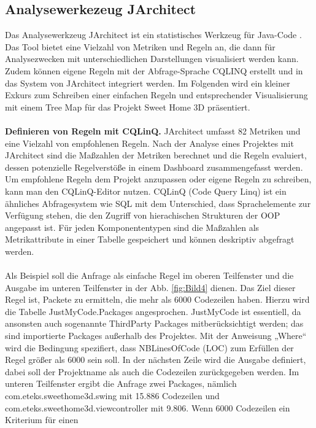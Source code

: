 \documentclass[12pt]{article}
\begin{document}
\subsection{Analysewerkezeug JArchitect}

Das Analysewerkzeug JArchitect ist ein statistisches Werkzeug für
Java-Code \cite{Get18}. Das Tool bietet eine Vielzahl von Metriken
und Regeln an, die dann für Analysezwecken mit unterschiedlichen
Darstellungen visualisiert werden kann. Zudem können eigene
Regeln mit der Abfrage-Sprache CQLINQ erstellt und in das System
von JArchitect integriert werden. Im Folgenden wird ein kleiner
Exkurs zum Schreiben einer einfachen Regeln und entsprechender
Visualisierung mit einem Tree Map für das Projekt Sweet Home 3D
präsentiert.
\\
\\
\textbf{Definieren von Regeln mit CQLinQ.} JArchitect umfasst 82
Metriken und eine Vielzahl von empfohlenen Regeln. Nach der
Analyse eines Projektes mit JArchitect sind die Maßzahlen der
Metriken berechnet und die Regeln evaluiert, dessen potenzielle
Regelverstöße in einem Dashboard zusammengefasst werden. Um
empfohlene Regeln dem Projekt anzupassen oder eigene Regeln zu
schreiben, kann man den CQLinQ-Editor nutzen. CQLinQ (Code Query
Linq) ist ein ähnliches Abfragesystem wie SQL mit dem
Unterschied, dass Sprachelemente zur Verfügung stehen, die den
Zugriff von hierachischen Strukturen der OOP angepasst ist. Für
jeden Komponententypen sind die Maßzahlen als Metrikattribute in
einer Tabelle gespeichert und können deskriptiv abgefragt werden.
\\
\\
Als Beispiel soll die Anfrage als einfache Regel im oberen
Teilfenster und die Ausgabe im unteren Teilfenster in der Abb.
\ref{fig:Bild4} dienen. Das Ziel dieser Regel ist, Packete zu
ermitteln, die mehr als 6000 Codezeilen haben. Hierzu wird die
Tabelle JustMyCode.Packages angesprochen.  JustMyCode ist
essentiell, da ansonsten auch sogenannte ThirdParty Packages
mitberücksichtigt werden; das sind importierte Packages außerhalb
des Projektes.  Mit der Anweisung „Where“ wird die Bedingung
spezifiert, dass NBLinesOfCode (LOC) zum Erfüllen der Regel
größer als 6000 sein soll.  In der nächsten Zeile wird die
Ausgabe definiert, dabei soll der Projektname als auch die
Codezeilen zurückgegeben werden. Im unteren Teilfenster ergibt
die Anfrage zwei Packages, nämlich com.eteks.sweethome3d.swing
mit 15.886 Codezeilen und com.eteks.sweethome3d.viewcontroller
mit 9.806.  Wenn 6000 Codezeilen ein Kriterium für einen
\end{document}
